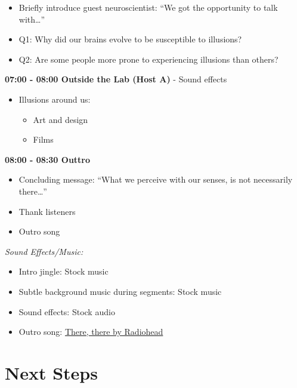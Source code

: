 \documentclass[
  letterpaper,
  DIV=11,
  numbers=noendperiod]{scrreprt}
\providecommand{\tightlist}{%
  \setlength{\itemsep}{0pt}\setlength{\parskip}{0pt}}\usepackage{longtable,booktabs,array}
\begin{document}
\begin{tcolorbox}
\begin{itemize}
\tightlist
\item
  Briefly introduce guest neuroscientist: ``We got the opportunity to
  talk with\ldots{}''
\item
  Q1: Why did our brains evolve to be susceptible to illusions?
\item
  Q2: Are some people more prone to experiencing illusions than others?
\end{itemize}

\textbf{07:00 - 08:00 \textbar{} Outside the Lab (Host A)} - Sound
effects

\begin{itemize}
\tightlist
\item
  Illusions around us:

  \begin{itemize}
  \tightlist
  \item
    Art and design
  \item
    Films
  \end{itemize}
\end{itemize}

\textbf{08:00 - 08:30 \textbar{} Outtro}

\begin{itemize}
\tightlist
\item
  Concluding message: ``What we perceive with our senses, is not
  necessarily there\ldots{}''
\item
  Thank listeners
\item
  Outro song
\end{itemize}

\emph{Sound Effects/Music:}

\begin{itemize}
\tightlist
\item
  Intro jingle: Stock music
\item
  Subtle background music during segments: Stock music
\item
  Sound effects: Stock audio
\item
  Outro song:
  \href{https://www.youtube.com/watch?v=7AQSLozK7aA&t=1s}{There, there
  by Radiohead}
\end{itemize}

\end{tcolorbox}

\section{Next Steps}\label{next-steps-5}
\end{document}
